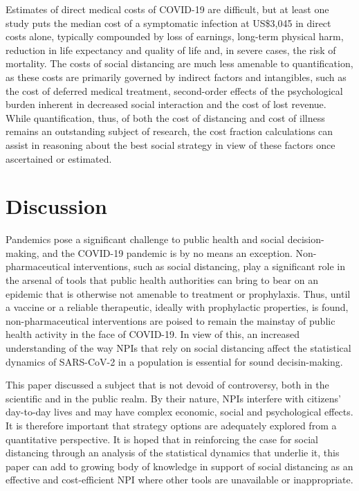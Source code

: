 \documentclass[12pt]{article}
\begin{document}
Estimates of direct medical costs of COVID-19 are difficult, but at least one study puts the median cost of a symptomatic infection at US\$3,045 in direct costs alone,\cite{bartsch2020potential} typically compounded by loss of earnings, long-term physical harm, reduction in life expectancy and quality of life and, in severe cases, the risk of mortality. The costs of social distancing are much less amenable to quantification, as these costs are primarily governed by indirect factors and intangibles, such as the cost of deferred medical treatment, second-order effects of the psychological burden inherent in decreased social interaction and the cost of lost revenue. While quantification, thus, of both the cost of distancing and cost of illness remains an outstanding subject of research, the cost fraction calculations can assist in reasoning about the best social strategy in view of these factors once ascertained or estimated.



\section{Discussion} %
\label{sec:discussion}

Pandemics pose a significant challenge to public health and social decision-making, and the COVID-19 pandemic is by no means an exception. Non-pharmaceutical interventions, such as social distancing, play a significant role in the arsenal of tools that public health authorities can bring to bear on an epidemic that is otherwise not amenable to treatment or prophylaxis. Thus, until a vaccine or a reliable therapeutic, ideally with prophylactic properties, is found, non-pharmaceutical interventions are poised to remain the mainstay of public health activity in the face of COVID-19. In view of this, an increased understanding of the way NPIs that rely on social distancing affect the statistical dynamics of SARS-CoV-2 in a population is essential for sound decisin-making.

This paper discussed a subject that is not devoid of controversy, both in the scientific and in the public realm. By their nature, NPIs interfere with citizens' day-to-day lives and may have complex economic, social and psychological effects. It is therefore important that strategy options are adequately explored from a quantitative perspective. It is hoped that in reinforcing the case for social distancing through an analysis of the statistical dynamics that underlie it, this paper can add to growing body of knowledge in support of social distancing as an effective and cost-efficient NPI where other tools are unavailable or inappropriate.
\end{document}

